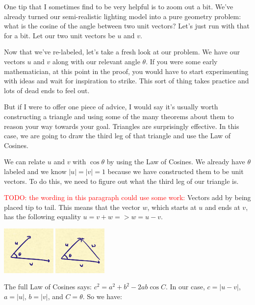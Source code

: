 \documentclass{article}
\newcommand\todo[1]{\textcolor{red}{TODO: #1}}
\begin{document}
One tip that I sometimes find to be very helpful is to zoom out a bit.
We've already turned our semi-realistic lighting model into a pure geometry problem: what is the cosine of the angle between two unit vectors?
Let's just run with that for a bit.
Let our two unit vectors be $u$ and $v$.

Now that we've re-labeled, let's take a fresh look at our problem.
We have our vectors $u$ and $v$ along with our relevant angle $\theta$.
If you were some early mathematician, at this point in the proof, you would have to start experimenting with ideas and wait for inspiration to strike.
This sort of thing takes practice and lots of dead ends to feel out.

But if I were to offer one piece of advice, I would say it's usually worth constructing a triangle and using some of the many theorems about them to reason your way towards your goal.
Triangles are surprisingly effective.
In this case, we are going to draw the third leg of that triangle and use the Law of Cosines.

We can relate $u$ and $v$ with $\cos \theta$ by using the Law of Cosines.
We already have $\theta$ labeled and we know $|u| = |v| = 1$ because we have constructed them to be unit vectors.
To do this, we need to figure out what the third leg of our triangle is.

\todo{the wording in this paragraph could use some work:}
Vectors add by being placed tip to tail.
This means that the vector $w$, which starts at $u$ and ends at $v$, has the following equality $u = v + w => w = u - v$.

\begin{center}
	\includegraphics[width=0.2\textwidth,frame]{assets/uv.jpg}
	\hspace{0.2\textwidth}
	\includegraphics[width=0.197\textwidth,frame]{assets/uvw.jpg}
\end{center}

The full Law of Cosines says: $c^2 = a^2 + b^2 - 2ab \cos C$.
In our case, $c = | u - v |$, $a = |u|$, $b = |v|$, and $C = \theta$.
So we have:
\end{document}
